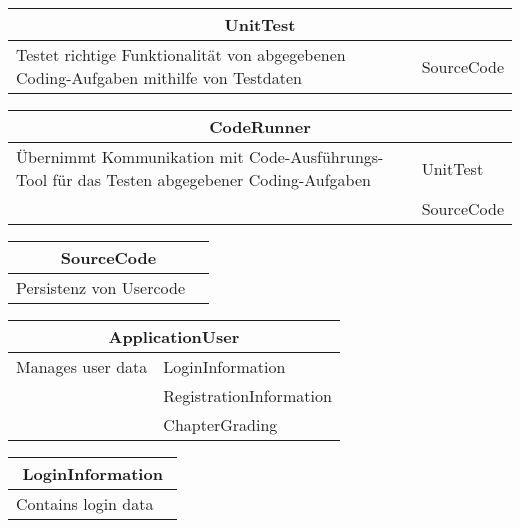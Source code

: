 \documentclass[11pt]{article}
\begin{document}
\begin{table}[h]
\begin{tabularx}{\textwidth}{|X|X|}
\hline
\multicolumn{2}{|c|}{UnitTest}\\ \hline
Testet richtige Funktionalität von abgegebenen Coding-Aufgaben mithilfe von Testdaten&SourceCode\\  \hline
\end{tabularx}
\end{table}

\begin{table}[h]
\begin{tabularx}{\textwidth}{|X|X|}
\hline
\multicolumn{2}{|c|}{CodeRunner}\\ \hline
Übernimmt Kommunikation mit Code-Ausführungs-Tool für das Testen abgegebener Coding-Aufgaben&UnitTest  \\  \hline
&SourceCode \\ \hline
\end{tabularx}
\end{table}


\begin{table}[h]
\begin{tabularx}{\textwidth}{|X|X|}
\hline
\multicolumn{2}{|c|}{SourceCode}\\ \hline
Persistenz von Usercode& \\  \hline
\end{tabularx}
\end{table}

\begin{table}[h]
\begin{tabularx}{\textwidth}{|X|X|}
\hline
\multicolumn{2}{|c|}{ApplicationUser}\\ \hline
Manages user data& LoginInformation  \\  \hline
&RegistrationInformation \\ \hline
 &ChapterGrading \\ \hline
\end{tabularx}
\end{table}

\begin{table}[h]
\begin{tabularx}{\textwidth}{|X|X|}
\hline
\multicolumn{2}{|c|}{LoginInformation}\\ \hline
Contains login data& \\  \hline
\end{tabularx}
\end{table}
\end{document}
